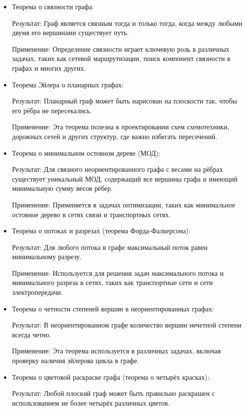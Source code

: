 \begin{itemize}
	\item Теорема о связности графа:
	
	Результат: Граф является связным тогда и только тогда, когда между любыми двумя его вершинами существует путь.
	
	Применение: Определение связности играет ключевую роль в различных задачах, таких как сетевой маршрутизации, поиск компонент связности в графах и многих других.
	
	\item Теорема Эйлера о планарных графах:
	
	Результат: Планарный граф может быть нарисован на плоскости так, чтобы его рёбра не пересекались.
	
	Применение: Эта теорема полезна в проектировании схем схемотехники, дорожных сетей и других структур, где важно избегать пересечений.
	
	\item Теорема о минимальном остовном дереве (МОД):
	
	Результат: Для связного неориентированного графа с весами на рёбрах существует уникальный МОД, содержащий все вершины графа и имеющий минимальную сумму весов рёбер.
	
	Применение: Применяется в задачах оптимизации, таких как минимальное остовное дерево в сетях связи и транспортных сетях.
	
	\item Теорема о потоках и разрезах (теорема Форда-Фалкерсона):
	
	Результат: Для любого потока в графе максимальный поток равен минимальному разрезу.
	
	Применение: Используется для решения задач максимального потока и минимального разреза в сетях, таких как транспортные сети и сети электропередачи.
	
	\item Теорема о четности степеней вершин в неориентированных графах:
	
	Результат: В неориентированном графе количество вершин нечетной степени всегда четно.
	
	Применение: Эта теорема используется в различных задачах, включая проверку наличия эйлерова цикла в графе.
	
	\item Теорема о цветовой раскраске графа (теорема о четырёх красках):
	
	Результат: Любой плоский граф может быть правильно раскрашен с использованием не более четырёх различных цветов.
	

\end{itemize}
